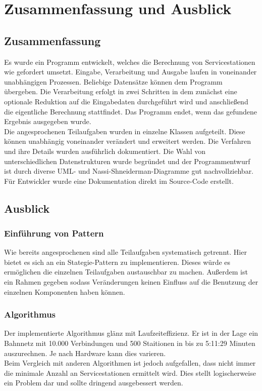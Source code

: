 \chapter{Zusammenfassung und Ausblick}\label{ch:zusammenfassung-und-ausblick}


\section{Zusammenfassung}\label{sec:zusammenfassung}
Es wurde ein Programm entwickelt, welches die Berechnung von Servicestationen wie gefordert umsetzt.
Eingabe, Verarbeitung und Ausgabe laufen in voneinander unabhängigen Prozessen. Beliebige Datensätze können dem Programm übergeben. Die Verarbeitung erfolgt in zwei Schritten in dem zunächst eine optionale Reduktion auf die Eingabedaten durchgeführt wird und anschließend die eigentliche Berechnung stattfindet. Das Programm endet, wenn das gefundene Ergebnis ausgegeben wurde.\\
Die angesprochenen Teilaufgaben wurden in einzelne Klassen aufgeteilt. Diese können unabhängig voneinander verändert und erweitert werden.
Die Verfahren und ihre Details wurden ausführlich dokumentiert. Die Wahl von unterschiedlichen Datenstrukturen wurde begründet und der Programmentwurf ist durch diverse UML- und Nassi-Shneiderman-Diagramme gut nachvollziehbar. Für Entwickler wurde eine Dokumentation direkt im Source-Code erstellt.

\section{Ausblick}\label{sec:ausblick}
\subsection{Einführung von Pattern}\label{sec:pattern}
Wie bereits angesprochenen sind alle Teilaufgaben systematisch getrennt. Hier bietet es sich an ein Stategie-Pattern zu implementieren. Dieses würde es ermöglichen die einzelnen Teilaufgaben austauschbar zu machen. Außerdem ist ein Rahmen gegeben sodass Veränderungen keinen Einfluss auf die Benutzung der einzelnen Komponenten haben können.\\

\subsection{Algorithmus}\label{sec:algorithmus}
Der implementierte Algorithmus glänz mit Laufzeiteffizienz. Er ist in der Lage ein Bahnnetz mit 10.000 Verbindungen und 500 Staitionen in bis zu 5:11:29 Minuten auszurechnen. Je nach Hardware kann dies varieren.\\
Beim Vergleich mit anderen Algorithmen ist jedoch aufgefallen, dass nicht immer die minimale Anzahl an Servicestationen ermittelt wird. Dies stellt logischerweise ein Problem dar und sollte dringend ausgebessert werden.\\

